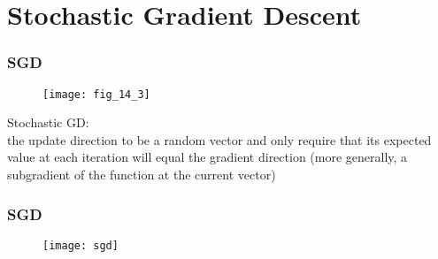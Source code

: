 \section{Stochastic Gradient Descent}

\begin{frame}
\frametitle{SGD}

\begin{figure}
    \centering
    \texttt{[image: fig\_14\_3]}
\end{figure}

Stochastic GD:\\
the update direction to be a random vector and
only require that its expected value at each iteration will equal the gradient direction
(more generally, a subgradient of the function at the current vector)

\end{frame}

\begin{frame}
\frametitle{SGD}

\begin{figure}
    \centering
    \texttt{[image: sgd]}
\end{figure}

\end{frame}

